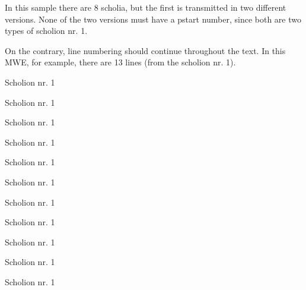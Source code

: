 \documentclass[a4paper]{book}
\begin{document}
In this sample there are 8 scholia, but the first is transmitted in two different versions. None of the two versions must have a pstart number, since both are two types of scholion nr. 1.

On the contrary, line numbering should continue throughout the text. In this MWE, for example, there are 13 lines (from the scholion nr. 1).



\beginnumbering
\numberpstarttrue


\pstart%
    Scholion nr. 1%
\pend
\pausenumbering


\resumenumbering

\pstart%
    Scholion nr. 1%
\pend
\pausenumbering

\resumenumbering
\pstart%
    Scholion nr. 1%
\pend
\pausenumbering

\resumenumbering

\pstart%
    Scholion nr. 1%
\pend
\pausenumbering

\resumenumbering

\pstart%
    Scholion nr. 1%
\pend
\pausenumbering

\resumenumbering


\pstart%
    Scholion nr. 1%
\pend
\pausenumbering

\resumenumbering

\pstart%
    Scholion nr. 1%
\pend
\pausenumbering

\resumenumbering

\pstart%
    Scholion nr. 1%
\pend
\pausenumbering

\resumenumbering

\pstart%
    Scholion nr. 1%
\pend
\pausenumbering

\resumenumbering

\pstart%
    Scholion nr. 1%
\pend
\pausenumbering

\resumenumbering

\pstart%
    Scholion nr. 1%
\pend
\pausenumbering
\end{document}
